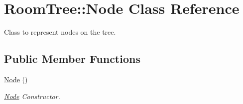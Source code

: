 \hypertarget{classRoomTree_1_1Node}{\section{Room\-Tree\-:\-:Node Class Reference}
\label{classRoomTree_1_1Node}
}


Class to represent nodes on the tree.  


\subsection*{Public Member Functions}
\begin{DoxyCompactItemize}
\item 
\hyperlink{classRoomTree_1_1Node_ab3c68ffc2f8dd40c8bf94e0b047766cb}{Node} ()
\begin{DoxyCompactList}\small\item\em \hyperlink{classRoomTree_1_1Node}{Node} Constructor. \end{DoxyCompactList}\end{DoxyCompactItemize}

